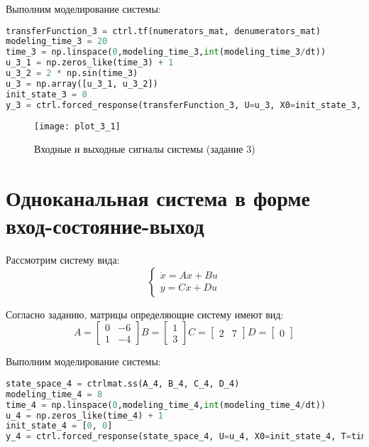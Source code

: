 Выполним моделирование системы:
\begin{lstlisting}[language=Python]
transferFunction_3 = ctrl.tf(numerators_mat, denumerators_mat)
modeling_time_3 = 20 
time_3 = np.linspace(0,modeling_time_3,int(modeling_time_3/dt))
u_3_1 = np.zeros_like(time_3) + 1
u_3_2 = 2 * np.sin(time_3)
u_3 = np.array([u_3_1, u_3_2])
init_state_3 = 0
y_3 = ctrl.forced_response(transferFunction_3, U=u_3, X0=init_state_3, T=time_3).outputs
\end{lstlisting}

\begin{figure}[h]
    \centering
    \texttt{[image: plot\_3\_1]}
    \caption{\label{fig:The-caption-1}Входные и выходные сигналы системы (задание 3)}
\end{figure}
\pagebreak

\section{Одноканальная система в форме вход-состояние-выход}
Рассмотрим систему вида:
\begin{equation}
    \begin{cases}
        \dot x = Ax + Bu \\
        y = Cx + Du
    \end{cases}
\end{equation}

Согласно заданию, матрицы определяющие систему имеют вид:
\begin{equation*}
    A = \begin{bmatrix}
        0 & -6   \\
        1 &  -4 
        \end{bmatrix}
        B = \begin{bmatrix}
            1  \\
            3
            \end{bmatrix}
        C = \begin{bmatrix}
            2 & 7 
            \end{bmatrix}
        D = \begin{bmatrix}
             0
            \end{bmatrix}
\end{equation*}

Выполним моделирование системы:
\begin{lstlisting}[language=Python]
state_space_4 = ctrlmat.ss(A_4, B_4, C_4, D_4)
modeling_time_4 = 8 
time_4 = np.linspace(0,modeling_time_4,int(modeling_time_4/dt))
u_4 = np.zeros_like(time_4) + 1
init_state_4 = [0, 0]
y_4 = ctrl.forced_response(state_space_4, U=u_4, X0=init_state_4, T=time_4).outputs
\end{lstlisting}

